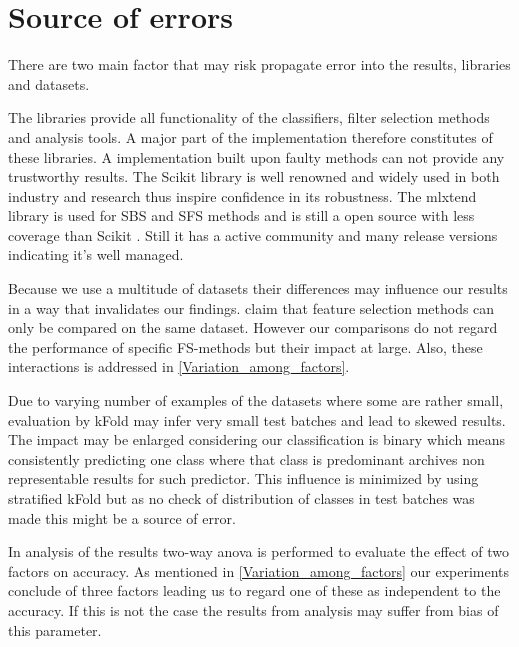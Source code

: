

\section{Source of errors}
\label{sec:source_of_errors}

There are two main factor that may risk propagate error into the results, libraries and datasets.

The libraries provide all functionality of the classifiers, filter selection methods and analysis tools. A major part of the implementation therefore constitutes of these libraries. A implementation built upon faulty methods can not provide any trustworthy results. The Scikit library \parencite{scikit-learn} is well renowned and widely used in both industry and research thus inspire confidence in its robustness. The mlxtend library is used for SBS and SFS methods and is still a open source with less coverage than Scikit \parencite{mlextend}. Still it has a active community and many release versions indicating it's well managed.

Because we use a multitude of datasets their differences may influence our results in a way that invalidates our findings. \textcite{c201416} claim that feature selection methods can only be compared on the same dataset. However our comparisons do not regard the performance of specific FS-methods but their impact at large. Also, these interactions is addressed in \ref{Variation_among_factors}.

Due to varying number of examples of the datasets where some are rather small, evaluation by kFold may infer very small test batches and lead to skewed results. The impact may be enlarged considering our classification is binary which means consistently predicting one class where that class is predominant archives non representable results for such predictor. This influence is minimized by using stratified kFold but as no check of distribution of classes in test batches was made this might be a source of error.

In analysis of the results two-way anova is performed to evaluate the effect of two factors on accuracy. As mentioned in \ref{Variation_among_factors} our experiments conclude of three factors leading us to regard one of these as independent to the accuracy. If this is not the case the results from analysis may suffer from bias of this parameter.
